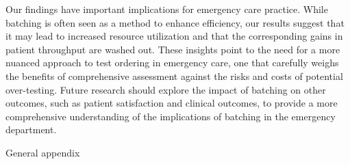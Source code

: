 \documentclass[,,nonblindrev]{informs}
\begin{document}
Our findings have important implications for emergency care practice.
While batching is often seen as a method to enhance efficiency, our
results suggest that it may lead to increased resource utilization and
that the corresponding gains in patient throughput are washed out. These
insights point to the need for a more nuanced approach to test ordering
in emergency care, one that carefully weighs the benefits of
comprehensive assessment against the risks and costs of potential
over-testing. Future research should explore the impact of batching on
other outcomes, such as patient satisfaction and clinical outcomes, to
provide a more comprehensive understanding of the implications of
batching in the emergency department.

\clearpage

\begin{APPENDIX}{General appendix}


\end{APPENDIX}
\end{document}
